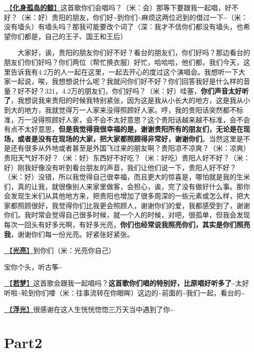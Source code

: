 \documentclass[]{ctexbook}
\begin{document}
\hyperref[hua-shen-gu-dao-de-jing]{🎵【\textbf{化身孤岛的鲸}】}这首歌你们会唱吗？（米：会）那等下要跟我一起唱，好不好？（米：好）贵阳的朋友，你们好\textasciitilde 到你们\textasciitilde 麻烦这两位迟到的借过一下\textasciitilde（米：没有墙头）有墙头吗？那我可能要改个词了（深：我才不信你们都没有墙头，也希望你们都是，自己的王子、国王和王后）

  大家好，诶，贵阳的朋友你们好不好？看台的朋友们，你们好吗？那边看台的朋友们你们好吗？你们两位（帮忙换衣服）好忙，哈哈哈，他们都，我们今天，这里告诉我有4.2万的人一起在这里，一起去开心的度过这个演唱会。我想听一下大家一起说，唉，我想想说什么呢？我就问你们好不好？你们回答我好是什么样的音量？好不好？321，4.2万的朋友们，你们好吗？（米：好）哇塞，\textbf{你们声音太好听了}，我想说我来贵阳的时候我特别紧张，因为这是我从小长大的地方，这是我从小到大的地方，我就觉得万一人家来没得照顾好人家。哼，我的贵阳话突然都不标准，万一没得照顾好人家，会不会不太好意思？这个贵阳话越来越不标准，会不会有点不太好意思，\textbf{但是我觉得我很幸福的是，谢谢贵阳所有的朋友们，无论是在现场，或者是没有在现场的大家，把大家都照顾得非常好，谢谢你们}。当然这里是不是还有很多从外地或者甚至是外国飞过来的朋友啊？贵阳凉不凉爽？（米：凉爽）贵阳天气好不好？（米：好）东西好不好吃？（米：好吃）贵阳人好不好？（米：好）刚我好像没有听到看台朋友的声音，我们让他们说一下，贵阳人好不好？（米：好）没错，所以我觉得自己很幸福，而且更大的惊喜是，哪怕就是我的生米们，真的让我，就很像别人来家里做客，会担心，诶，完了没有做好什么事。那你会发现生米们从其他地方来，把贵阳也增加了很多周深的一些元素或怎么样，把大家都照顾很好，我觉得你们比我更会照顾人，谢谢你们的爱，我都感受到了，谢谢你们。我时常会觉得自己很多时候，就一个人的时候，对吧，很孤单，但我会发现每次一回头有好多光啊，有好多光亮，\textbf{你们也经常说我照亮你们，其实是你们照亮我}，谢谢你们每一份光亮。好紧张好紧张。

\hyperref[silver-linings]{🎵【\textbf{光亮}】}到你们（米：光亮你自己）

宝你个头，听古筝\textasciitilde{}

\hyperref[ruomeng]{🎵【\textbf{若梦}】}这首歌会跟我一起唱吗？\textbf{这首歌你们唱的特别好，比原唱好听多了\textasciitilde{}}太好听啦\textasciitilde 轮到你们喽（米：往事流转在你眼眸）这边的\textasciitilde 前面的\textasciitilde 我们一起，看台的\textasciitilde{}

\hyperref[floating-light]{🎵【\textbf{浮光}】}很感谢在这人生恍恍惚惚三万天当中遇到了你\textasciitilde{}

\section{Part2}\label{guiyang-20240713-part2}
\end{document}
